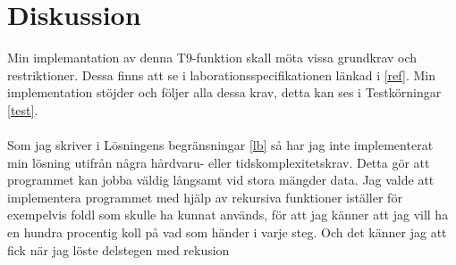 \documentclass[a4paper]{article}
\begin{document}
\section{Diskussion}
Min implemantation av denna T9-funktion skall möta vissa grundkrav och restriktioner. Dessa finns att se i laborationsspecifikationen länkad i \ref{ref}. Min implementation stöjder och följer alla dessa krav, detta kan ses i Testkörningar \ref{test}.\\ \\
Som jag skriver i Lösningens begränsningar \ref{lb} så har jag inte implementerat min lösning utifrån några hårdvaru- eller tidskomplexitetskrav. Detta gör att programmet kan jobba väldig långsamt vid stora mängder data. Jag valde att implementera programmet med hjälp av rekursiva funktioner iställer för exempelvis foldl som skulle ha kunnat används, för att jag känner att jag vill ha en hundra procentig koll på vad som händer i varje steg. Och det känner jag att fick när jag löste delstegen med rekusion
\end{document}

